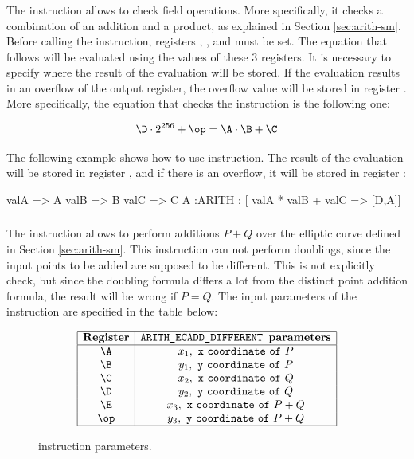 \subsubsection{\ARITH}

The \ARITH instruction allows to check field operations. More specifically, it checks a combination of an addition and a product, as explained in Section \ref{sec:arith-sm}. Before calling the \ARITH instruction, registers \A, \B, and \C must be set. The equation that follows will be evaluated using the values of these $3$ registers. It is necessary to specify where the result of the evaluation will be stored. If the evaluation results in an overflow of the output register, the overflow value will be stored in register \D. More specifically, the equation that checks the \ARITH instruction is the following one:

\[
\D \cdot 2^{256} + \op = \A \cdot \B + \C
\]

The following example shows how to use \ARITH instruction. The result of the evaluation will be stored in register \A, and if there is an overflow, it will be stored in register \D:
\begin{zkasm}
    valA => A          
    valB => B          
    valC => C
    A            :ARITH ; [ valA * valB + valC => [D,A]]
\end{zkasm}





\subsubsection{\ARITHADDDIFF}

The \ARITHADDDIFF instruction allows to perform additions $P + Q$ over the elliptic curve defined in Section \ref{sec:arith-sm}. This instruction can not perform doublings, since the input points to be added are supposed to be different. This is not explicitly check, but since the doubling formula differs a lot from the distinct point addition formula, the result will be wrong if $P = Q$. The input parameters of the instruction are specified in the table below:

\begin{figure}[h!]
\renewcommand{\figurename}{Table}
\[
\begin{array}{|c|c|}
\hline
\mathbf{Register} &\texttt{ARITH\_ECADD\_DIFFERENT } \textbf{parameters} \\ \hline
\A & x_1, \mathtt{~x~coordinate~of~}P \\
\B & y_1, \mathtt{~y~coordinate~of~}P \\
\C & x_2, \mathtt{~x~coordinate~of~}Q \\
\D & y_2, \mathtt{~y~coordinate~of~}Q \\
\E & x_3, \mathtt{~x~coordinate~of~}P+Q \\
\op & y_3, \mathtt{~y~coordinate~of~}P+Q \\
\hline
\end{array}
\]
\caption{\ARITHADDDIFF instruction parameters.}
\label{tab:memory-first-example}
\end{figure}

